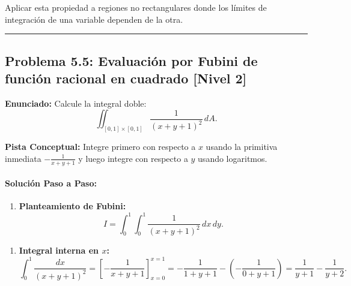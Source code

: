 \documentclass[11pt,a4paper]{article}
\begin{document}
\begin{trapbox}
Aplicar esta propiedad a regiones no rectangulares donde los límites de integración de una variable dependen de la otra.
\end{trapbox}

\vspace{0.5cm}
\hrule
\vspace{0.5cm}

\subsection*{Problema 5.5: Evaluación por Fubini de función racional en cuadrado \hfill \color{primaryblue}\small[Nivel 2]}

\begin{tcolorbox}[colback=white,colframe=gray!40,arc=1mm,boxrule=0.5pt,left=3mm,right=3mm,top=2mm,bottom=2mm]
\textbf{Enunciado:} Calcule la integral doble:
\begin{equation*}
\iint_{[0,1] \times [0,1]} \frac{1}{(x + y + 1)^2} \, dA.
\end{equation*}
\end{tcolorbox}

\begin{tcolorbox}[colback=yellow!4,colframe=accentamber!70,arc=1mm,boxrule=0.5pt,left=3mm,right=3mm,top=1.5mm,bottom=1.5mm]
\textbf{Pista Conceptual:} Integre primero con respecto a $x$ usando la primitiva inmediata $-\frac{1}{x+y+1}$ y luego integre con respecto a $y$ usando logaritmos.
\end{tcolorbox}

\paragraph{Solución Paso a Paso:}\par
\begin{enumerate}[label=\textbf{\arabic*.}]
\item \textbf{Planteamiento de Fubini:}
\begin{equation*}
I = \int_0^1 \int_0^1 \frac{1}{(x + y + 1)^2} \, dx \, dy.
\end{equation*}
\end{enumerate}

\begin{enumerate}[label=\textbf{\arabic*.}]
\item \textbf{Integral interna en $x$:}
\begin{equation*}
\int_0^1 \frac{dx}{(x + y + 1)^2} = \left[ -\frac{1}{x + y + 1} \right]_{x=0}^{x=1} = -\frac{1}{1 + y + 1} - \left(-\frac{1}{0 + y + 1}\right) = \frac{1}{y + 1} - \frac{1}{y + 2}.
\end{equation*}
\end{enumerate}
\end{document}
